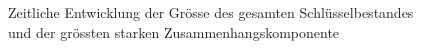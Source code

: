 \begin{figure}[th!]
  \centering
  \caption{Zeitliche Entwicklung der Gr\"osse des gesamten
    Schl\"usselbestandes  und der
      gr\"ossten starken Zusammenhangskomponente }
  \label{fig:size-dev}
\end{figure}

